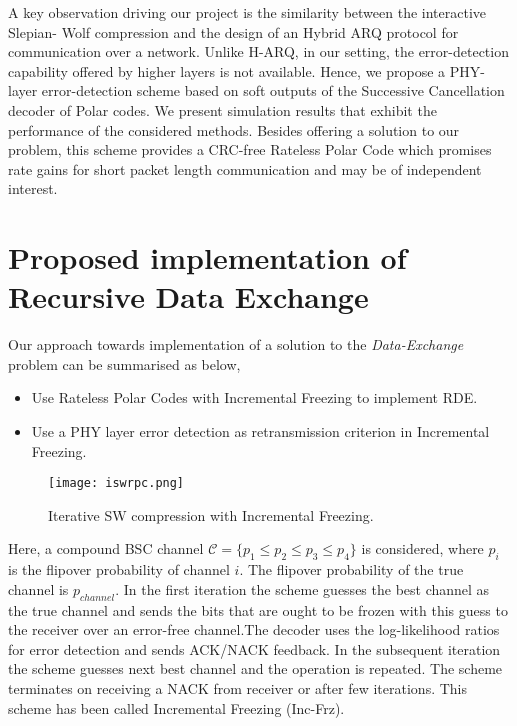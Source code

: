 \documentclass[
11pt, %
a4paper, %
oneside, %
headinclude,footinclude, %
BCOR5mm, %
]{scrartcl}
\begin{document}
A key observation driving our project is the similarity between the interactive Slepian-
Wolf compression and the design of an Hybrid ARQ protocol for communication over a
network. Unlike H-ARQ, in our setting, the error-detection capability offered by higher layers
is not available. Hence, we propose a PHY-layer error-detection scheme based
on soft outputs of the Successive Cancellation decoder of Polar codes. We present simulation
results that exhibit the performance of the considered methods. Besides offering a
solution to our problem, this scheme provides a CRC-free Rateless Polar Code which
promises rate gains for short packet length communication and may be of independent
interest.

\newpage
\section*{Proposed implementation of Recursive Data Exchange} \label{propsol}
Our approach towards implementation of a solution to the \emph{Data-Exchange} problem can be summarised as below, 
\begin{itemize}
\item{Use Rateless Polar Codes with Incremental Freezing to implement RDE.}
\item{Use a PHY layer error detection as retransmission criterion in Incremental Freezing.}
\end{itemize}
\begin{figure}[h]
 \begin{center}
    \texttt{[image: iswrpc.png]}
  \end{center}
  \caption{Iterative SW compression with Incremental Freezing.}
  \label{fig:iswrpc}
\end{figure} 
Here, a compound BSC channel $\mathcal{C}=\{ p_1 \leq p_2 \leq p_3 \leq p_4\}$ is considered, where $p_i$ is the flipover probability of channel $i$. The flipover probability of the true channel is $p_{channel}$.
In the first iteration the scheme guesses the best channel as the true channel and sends the bits that are ought to be frozen with this guess to the receiver over an error-free channel.The decoder uses the log-likelihood ratios for error detection and sends ACK/NACK feedback. In the subsequent iteration the scheme guesses next best channel and the operation is repeated. The scheme terminates on receiving a NACK from receiver or after few iterations. This scheme has been called Incremental Freezing (Inc-Frz).
\end{document}
